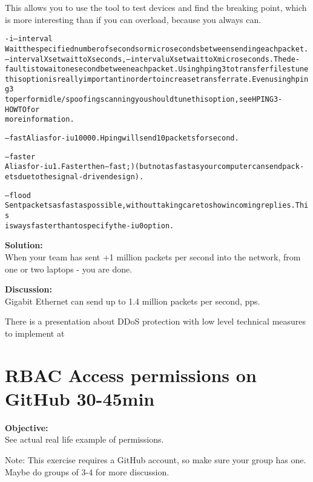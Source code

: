 \documentclass[a4paper,11pt,notitlepage]{report}
\begin{document}
This allows you to use the tool to test devices and find the breaking point, which is more interesting than if you can overload, because you always can.
\begin{alltt}\footnotesize
-i --interval
       Wait  the  specified  number  of  seconds or micro seconds between sending each packet.
       --interval X set wait to X seconds, --interval uX set wait to X micro seconds.  The de‐
       fault  is  to  wait one second between each packet. Using hping3 to transfer files tune
       this option is really important in order to increase transfer rate. Even  using  hping3
       to  perform  idle/spoofing  scanning  you should tune this option, see HPING3-HOWTO for
       more information.

--fast Alias for -i u10000. Hping will send 10 packets for second.

--faster
       Alias for -i u1. Faster then --fast ;) (but not as fast as your computer can send pack‐
       ets due to the signal-driven design).

--flood
       Sent  packets  as fast as possible, without taking care to show incoming replies.  This
       is ways faster than to specify the -i u0 option.
\end{alltt}

{\bf Solution:}\\
When your team has sent +1 million packets per second into the network, from one or two laptops - you are done.

{\bf Discussion:}\\
Gigabit Ethernet can send up to 1.4 million packets per second, pps.

There is a presentation about DDoS protection with low level technical measures to implement at\\
{\footnotesize {}}





\chapter{RBAC Access permissions on GitHub 30-45min}
\label{ex:github-perms}

{\bf Objective:}\\
See actual real life example of permissions.

Note: This exercise requires a GitHub account, so make sure your group has one. Maybe do groups of 3-4 for more discussion.
\end{document}
